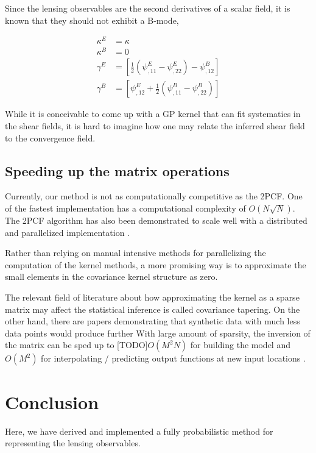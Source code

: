 Since the lensing observables are the second derivatives of a scalar field,
it is known that they should not exhibit a B-mode,  

 \begin{align}
	\kappa^E & = \kappa\\
	\kappa^B & = 0 \\
	\gamma^E &= \left[\frac{1}{2} (\psi^E_{,11} - \psi^E_{,22}) -
	\psi^B_{,12}\right]\\
	\gamma^B &= \left[\psi^E_{,12} + \frac{1}{2} (\psi^B_{,11} - \psi^B_{,22})\right]
\end{align}

While it is conceivable to come up with a GP kernel that can fit systematics 
in the shear fields, it is hard to imagine how one may relate the inferred
shear field to the convergence field. 





\subsection{Speeding up the matrix operations}
Currently, our method is not as computationally competitive as the 2PCF. One of
the fastest implementation has a computational complexity of $O(N\sqrt{N})$.
The 2PCF algorithm has also been demonstrated to scale well with a distributed and parallelized
implementation \citep{Chhugani2012}.

Rather than relying on manual intensive methods for parallelizing the
computation of the kernel methods, a more promising way is to approximate the
small elements in the covariance kernel structure as zero. 

The relevant field of literature about how approximating the kernel as a sparse
matrix may affect the
statistical inference is called covariance tapering. 
On the other hand, \citep{Snelson2006}
there are papers demonstrating that synthetic data with much less data points  
would produce further 
With large amount of
sparsity, the inversion of the matrix can be sped up to [TODO]$O(M^2N)$ for
building the model and $O(M^2)$ for interpolating / predicting output functions
at new input locations \citep{Snelson2006}.
  

\section{Conclusion}
Here, we have derived and implemented a fully probabilistic method for 
representing the lensing observables.   


